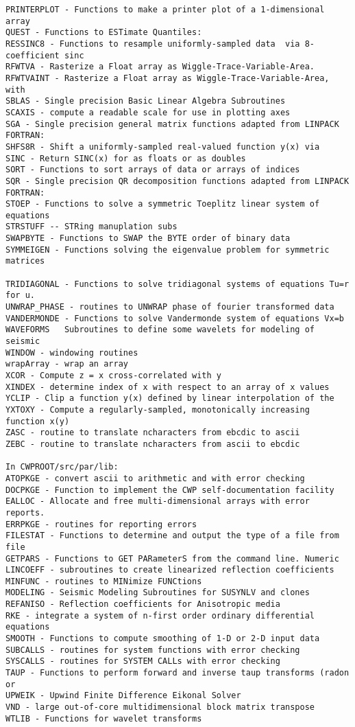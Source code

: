 {\begin{verbatim}
PRINTERPLOT - Functions to make a printer plot of a 1-dimensional array
QUEST - Functions to ESTimate Quantiles:
RESSINC8 - Functions to resample uniformly-sampled data  via 8-coefficient sinc
RFWTVA - Rasterize a Float array as Wiggle-Trace-Variable-Area.
RFWTVAINT - Rasterize a Float array as Wiggle-Trace-Variable-Area, with
SBLAS - Single precision Basic Linear Algebra Subroutines
SCAXIS - compute a readable scale for use in plotting axes
SGA - Single precision general matrix functions adapted from LINPACK FORTRAN:
SHFS8R - Shift a uniformly-sampled real-valued function y(x) via
SINC - Return SINC(x) for as floats or as doubles
SORT - Functions to sort arrays of data or arrays of indices
SQR - Single precision QR decomposition functions adapted from LINPACK FORTRAN:
STOEP - Functions to solve a symmetric Toeplitz linear system of equations
STRSTUFF -- STRing manuplation subs
SWAPBYTE - Functions to SWAP the BYTE order of binary data 
SYMMEIGEN - Functions solving the eigenvalue problem for symmetric matrices

TRIDIAGONAL - Functions to solve tridiagonal systems of equations Tu=r for u.
UNWRAP_PHASE - routines to UNWRAP phase of fourier transformed data
VANDERMONDE - Functions to solve Vandermonde system of equations Vx=b 
WAVEFORMS   Subroutines to define some wavelets for modeling of seismic
WINDOW - windowing routines
wrapArray - wrap an array
XCOR - Compute z = x cross-correlated with y
XINDEX - determine index of x with respect to an array of x values
YCLIP - Clip a function y(x) defined by linear interpolation of the
YXTOXY - Compute a regularly-sampled, monotonically increasing function x(y)
ZASC - routine to translate ncharacters from ebcdic to ascii
ZEBC - routine to translate ncharacters from ascii to ebcdic

In CWPROOT/src/par/lib:
ATOPKGE - convert ascii to arithmetic and with error checking
DOCPKGE - Function to implement the CWP self-documentation facility
EALLOC - Allocate and free multi-dimensional arrays with error reports.
ERRPKGE - routines for reporting errors
FILESTAT - Functions to determine and output the type of a file from file
GETPARS - Functions to GET PARameterS from the command line. Numeric
LINCOEFF - subroutines to create linearized reflection coefficients
MINFUNC - routines to MINimize FUNCtions
MODELING - Seismic Modeling Subroutines for SUSYNLV and clones
REFANISO - Reflection coefficients for Anisotropic media
RKE - integrate a system of n-first order ordinary differential equations
SMOOTH - Functions to compute smoothing of 1-D or 2-D input data
SUBCALLS - routines for system functions with error checking
SYSCALLS - routines for SYSTEM CALLs with error checking
TAUP - Functions to perform forward and inverse taup transforms (radon or
UPWEIK - Upwind Finite Difference Eikonal Solver
VND - large out-of-core multidimensional block matrix transpose
WTLIB - Functions for wavelet transforms


\end{verbatim}}

